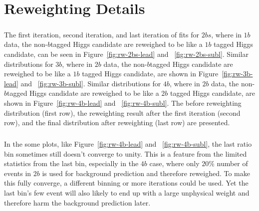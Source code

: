 \chapter{Reweighting Details}
\label{AppendixRW}

\paragraph{}
The first iteration, second iteration, and last iteration of fits for $2bs$, where in $1b$ data, the non-$b$tagged Higgs candidate are reweighed to be like a $1b$ tagged Higgs candidate, can be seen in Figure~\ref{fig:rw-2bs-lead} and ~\ref{fig:rw-2bs-subl}. 
Similar distributions for $3b$, where in $2b$ data, the non-$b$tagged Higgs candidate are reweighed to be like a $1b$ tagged Higgs candidate, are shown in Figure~\ref{fig:rw-3b-lead} and ~\ref{fig:rw-3b-subl}. 
Similar distributions for $4b$, where in $2b$ data, the non-$b$tagged Higgs candidate are reweighed to be like a $2b$ tagged Higgs candidate, are shown in Figure~\ref{fig:rw-4b-lead} and ~\ref{fig:rw-4b-subl}. 
The before reweighting distribution (first row), the reweighting result after the first iteration (second row), and the final distribution after reweighting (last row) are presented.

\paragraph{}
In the some plots, like Figure~\ref{fig:rw-4b-lead} and ~\ref{fig:rw-4b-subl}, the last ratio bin sometimes still doesn't converge to unity. 
This is a feature from the limited statistics from the last bin, especially in the $4b$ case, where only $20\%$ number of events in $2b$ is used for background prediction and therefore reweighed.
To make this fully converge, a different binning or more iterations could be used.
Yet the last bin's few event will also likely to end up with a large unphysical weight and therefore harm the background prediction later.

